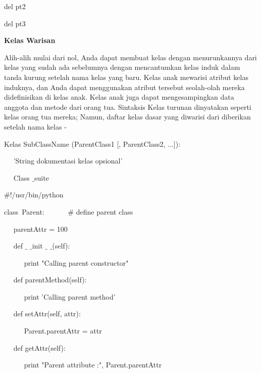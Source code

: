 \noindent 
del pt2 \par
\noindent 
del pt3 \par
\vspace{12pt}
\vspace{12pt}
\noindent 
{\fontsize{14pt}{14pt}\selectfont \textbf{Kelas Warisan} \\} \par
\vspace{12pt}
Alih-alih mulai dari nol, Anda dapat membuat kelas dengan menurunkannya dari kelas yang sudah ada sebelumnya dengan mencantumkan kelas induk dalam tanda kurung setelah nama kelas yang baru. Kelas anak mewarisi atribut kelas induknya, dan Anda dapat menggunakan atribut tersebut seolah-olah mereka didefinisikan di kelas anak. Kelas anak juga dapat mengesampingkan data anggota dan metode dari orang tua. Sintaksis Kelas turunan dinyatakan seperti kelas orang tua mereka; Namun, daftar kelas dasar yang diwarisi dari diberikan setelah nama kelas - \par
\vspace{12pt}
\noindent 
Kelas SubClassName (ParentClass1 [, ParentClass2, ...]): \par
\noindent 
~~ 'String dokumentasi kelas opsional' \par
\noindent 
~~ Class $  \_  $suite \par
\noindent 
 $  \#  $!/usr/bin/python \par
\vspace{12pt}
\noindent 
class~Parent:~~~~~~   $  \#  $ define parent class \par
\noindent 
~~ parentAttr = 100 \par
\noindent 
~~ def  $  \_  $ $  \_  $init $  \_  $ $  \_  $(self): \par
\noindent 
~~~~~ print "Calling parent constructor" \par
\vspace{12pt}
\noindent 
~~ def parentMethod(self): \par
\noindent 
~~~~~ print 'Calling parent method' \par
\vspace{12pt}
\noindent 
~~ def setAttr(self, attr): \par
\noindent 
~~~~~ Parent.parentAttr = attr \par
\vspace{12pt}
\noindent 
~~ def getAttr(self): \par
\noindent 
~~~~~ print "Parent attribute :", Parent.parentAttr \par
